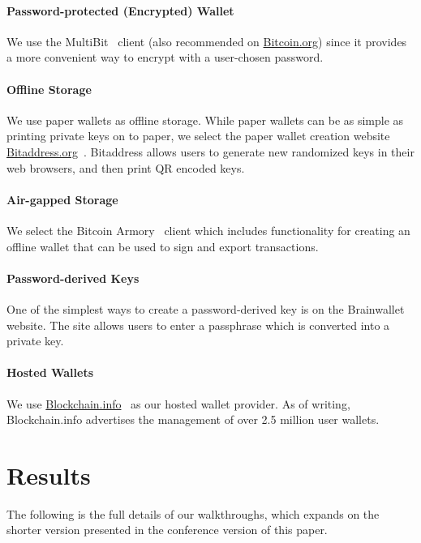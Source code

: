 \paragraph{Password-protected (Encrypted) Wallet} We use the MultiBit~\cite{multibit} client (also recommended on \url{Bitcoin.org}) since it provides a more convenient way to encrypt with a user-chosen password.

\paragraph{Offline Storage} We use paper wallets as offline storage. While paper wallets can be as simple as printing private keys on to paper, we select the paper wallet creation website \url{Bitaddress.org}~\cite{bitaddress}. Bitaddress allows users to generate new randomized keys in their web browsers, and then print QR encoded keys. 

\paragraph{Air-gapped Storage} We select the Bitcoin Armory~\cite{Bitcoinarmory} client which includes functionality for creating an offline wallet that can be used to sign and export transactions. 

\paragraph{Password-derived Keys} One of the simplest ways to create a password-derived key is on the Brainwallet~\cite{brainwallet} website. The site allows users to enter a passphrase which is converted into a private key. 

\paragraph{Hosted Wallets} We use \url{Blockchain.info}~\cite{blockchain} as our hosted wallet provider. As of writing, Blockchain.info advertises the management of over 2.5 million user wallets.


\section{Results}

The following is the full details of our walkthroughs, which expands on the shorter version presented in the conference version of this paper.

